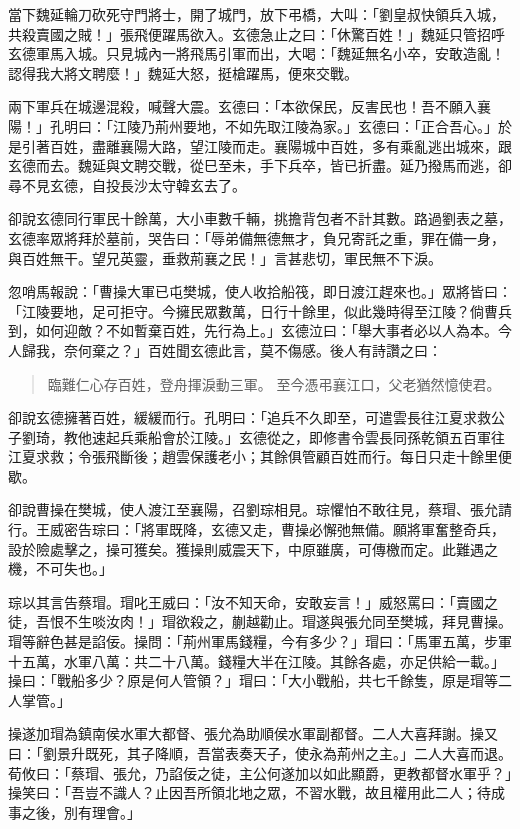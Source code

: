 當下魏延輪刀砍死守門將士，開了城門，放下弔橋，大叫：「劉皇叔快領兵入城，共殺賣國之賊！」張飛便躍馬欲入。玄德急止之曰：「休驚百姓！」魏延只管招呼玄德軍馬入城。只見城內一將飛馬引軍而出，大喝：「魏延無名小卒，安敢造亂！認得我大將文聘麼！」魏延大怒，挺槍躍馬，便來交戰。

兩下軍兵在城邊混殺，喊聲大震。玄德曰：「本欲保民，反害民也！吾不願入襄陽！」孔明曰：「江陵乃荊州要地，不如先取江陵為家。」玄德曰：「正合吾心。」於是引著百姓，盡離襄陽大路，望江陵而走。襄陽城中百姓，多有乘亂逃出城來，跟玄德而去。魏延與文聘交戰，從巳至未，手下兵卒，皆已折盡。延乃撥馬而逃，卻尋不見玄德，自投長沙太守韓玄去了。

卻說玄德同行軍民十餘萬，大小車數千輛，挑擔背包者不計其數。路過劉表之墓，玄德率眾將拜於墓前，哭告曰：「辱弟備無德無才，負兄寄託之重，罪在備一身，與百姓無干。望兄英靈，垂救荊襄之民！」言甚悲切，軍民無不下淚。

忽哨馬報說：「曹操大軍已屯樊城，使人收拾船筏，即日渡江趕來也。」眾將皆曰：「江陵要地，足可拒守。今擁民眾數萬，日行十餘里，似此幾時得至江陵？倘曹兵到，如何迎敵？不如暫棄百姓，先行為上。」玄德泣曰：「舉大事者必以人為本。今人歸我，奈何棄之？」百姓聞玄德此言，莫不傷感。後人有詩讚之曰：

\begin{quote}
臨難仁心存百姓，登舟揮淚動三軍。
至今憑弔襄江口，父老猶然憶使君。
\end{quote}

卻說玄德擁著百姓，緩緩而行。孔明曰：「追兵不久即至，可遣雲長往江夏求救公子劉琦，教他速起兵乘船會於江陵。」玄德從之，即修書令雲長同孫乾領五百軍往江夏求救；令張飛斷後；趙雲保護老小；其餘俱管顧百姓而行。每日只走十餘里便歇。

卻說曹操在樊城，使人渡江至襄陽，召劉琮相見。琮懼怕不敢往見，蔡瑁、張允請行。王威密告琮曰：「將軍既降，玄德又走，曹操必懈弛無備。願將軍奮整奇兵，設於險處擊之，操可獲矣。獲操則威震天下，中原雖廣，可傳檄而定。此難遇之機，不可失也。」

琮以其言告蔡瑁。瑁叱王威曰：「汝不知天命，安敢妄言！」威怒罵曰：「賣國之徒，吾恨不生啖汝肉！」瑁欲殺之，蒯越勸止。瑁遂與張允同至樊城，拜見曹操。瑁等辭色甚是諂佞。操問：「荊州軍馬錢糧，今有多少？」瑁曰：「馬軍五萬，步軍十五萬，水軍八萬：共二十八萬。錢糧大半在江陵。其餘各處，亦足供給一載。」操曰：「戰船多少？原是何人管領？」瑁曰：「大小戰船，共七千餘隻，原是瑁等二人掌管。」

操遂加瑁為鎮南侯水軍大都督、張允為助順侯水軍副都督。二人大喜拜謝。操又曰：「劉景升既死，其子降順，吾當表奏天子，使永為荊州之主。」二人大喜而退。荀攸曰：「蔡瑁、張允，乃諂佞之徒，主公何遂加以如此顯爵，更教都督水軍乎？」操笑曰：「吾豈不識人？止因吾所領北地之眾，不習水戰，故且權用此二人；待成事之後，別有理會。」

